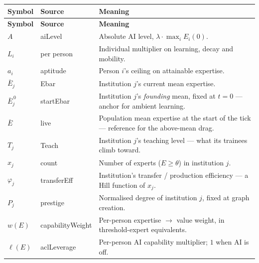 \documentclass[11pt]{article}
\begin{document}
\medskip
\noindent\footnotesize
\begin{longtable}{L{1.9cm} K{3.4cm} L{7.3cm}}
\toprule
\textbf{Symbol} & \textnormal{\textbf{Source}} & \textbf{Meaning} \\
\midrule
\endfirsthead
\toprule
\textbf{Symbol} & \textnormal{\textbf{Source}} & \textbf{Meaning} \\
\midrule
\endhead
\bottomrule
\endlastfoot
$A$ & aiLevel & Absolute AI level, $\lambda \cdot \max_i E_i(0)$.
  \\
$L_i$ & \textnormal{per person} & Individual multiplier on learning, decay and
  mobility.
  \\
$a_i$ & aptitude & Person $i$'s ceiling on attainable expertise.
  \\
$\bar E_j$ & Ebar & Institution $j$'s current mean expertise.
  \\
$\bar E_j^{\,0}$ & startEbar & Institution $j$'s \emph{founding} mean, fixed at
  $t = 0$ --- anchor for ambient learning.
  \\
$\bar E$ & \textnormal{live} & Population mean expertise at the start of the tick
  --- reference for the above-mean drag.
  \\
$T_j$ & Teach & Institution $j$'s teaching level --- what its trainees climb
  toward.
  \\
$x_j$ & \textnormal{count} & Number of experts ($E \ge \theta$) in institution
  $j$.
  \\
$\varphi_j$ & transferEff & Institution's transfer / production efficiency --- a
  Hill function of $x_j$.
  \\
$P_j$ & prestige & Normalised degree of institution $j$, fixed at graph creation.
  \\
$w(E)$ & capabilityWeight & Per-person expertise $\rightarrow$ value weight, in
  threshold-expert equivalents.
  \\
$\ell(E)$ & aclLeverage & Per-person AI capability multiplier; $1$ when AI is off.
  \\
\end{longtable}
\endgroup

\sloppy
\end{document}
